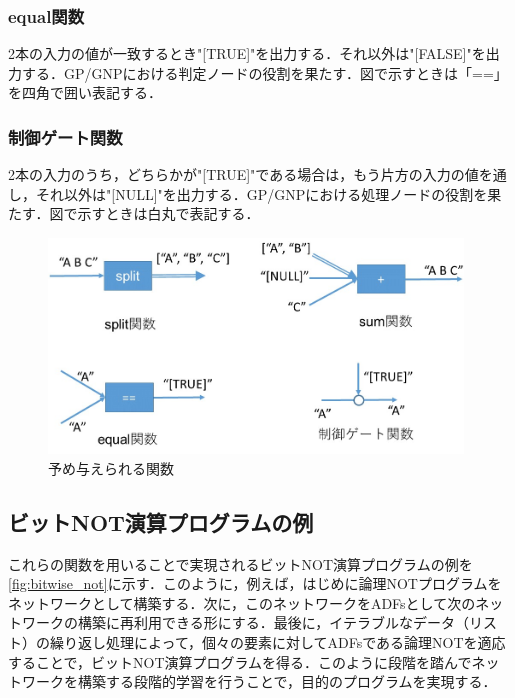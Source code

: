 \documentclass[exploratorypaper]{jsaiart} %
\begin{document}
\subsubsection{equal関数}
2本の入力の値が一致するとき"[TRUE]"を出力する．それ以外は"[FALSE]"を出力する．GP/GNPにおける判定ノードの役割を果たす．図で示すときは「==」を四角で囲い表記する．

\subsubsection{制御ゲート関数}
2本の入力のうち，どちらかが"[TRUE]"である場合は，もう片方の入力の値を通し，それ以外は"[NULL]"を出力する．GP/GNPにおける処理ノードの役割を果たす．図で示すときは白丸で表記する．

\begin{figure}[t]
    \begin{center}
        \includegraphics[width=110mm]{func.jpg}
    \end{center}
    \capwidth=90mm %
    \caption{予め与えられる関数}
    \label{fig:func}
\end{figure}

\subsection{ビットNOT演算プログラムの例}
これらの関数を用いることで実現されるビットNOT演算プログラムの例を\ref{fig:bitwise_not}に示す．このように，例えば，はじめに論理NOTプログラムをネットワークとして構築する．次に，このネットワークをADFsとして次のネットワークの構築に再利用できる形にする．最後に，イテラブルなデータ（リスト）の繰り返し処理によって，個々の要素に対してADFsである論理NOTを適応することで，ビットNOT演算プログラムを得る．このように段階を踏んでネットワークを構築する段階的学習を行うことで，目的のプログラムを実現する．
\end{document}
